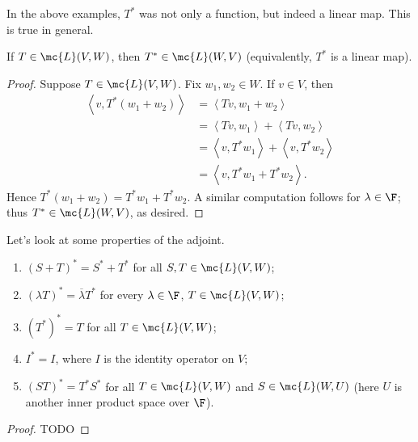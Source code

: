 \documentclass[math0540-lecture-notes.tex]{subfiles}
\begin{document}
In the above examples, $T^*$ was not only a function, but indeed a linear map. This is true in
general.
\begin{proposition}{}
  If $T\in \mc{L}(V,W)$, then $T^*\in \mc{L}(W,V)$ (equivalently, $T^*$ is a linear map).
\end{proposition}
\begin{proof}[Proof]
  Suppose $T\in \mc{L}(V,W)$. Fix $w_1,w_2\in W$. If $v\in V$, then
  \begin{align*}
    \left<v,T^*(w_1+w_2) \right>&= \left<Tv,w_1+w_2 \right>  \\
    &= \left<Tv,w_1 \right> +\left<Tv,w_2 \right>  \\
    &= \left<v,T^*w_1 \right> +\left<v,T^*w_2 \right>  \\
    &=\left<v,T^*w_1+T^*w_2 \right> 
  .\end{align*}
  Hence $T^*(w_1+w_2)=T^*w_1+T^*w_2$. A similar computation follows for $\lambda\in \F$; thus
  $T^*\in \mc{L}(W,V)$, as desired.
\end{proof}

Let's look at some properties of the adjoint.
\begin{proposition}{}
  \begin{enumerate}
    \item $(S+T)^*=S^*+T^*$ for all $S,T\in \mc{L}(V,W)$;
    \item $\left( \lambda T \right)^*=\overline{\lambda}T^* $ for every $\lambda\in \F$, $T\in
      \mc{L}(V,W)$;
    \item $(T^*)^*=T$ for all $T\in \mc{L}(V,W)$;
    \item $I^*=I$, where $I$ is the identity operator on $V$;
    \item $(ST)^*=T^*S^*$ for all $T\in \mc{L}(V,W)$ and $S\in \mc{L}(W,U)$ (here $U$ is another
      inner product space over $\F$).
  \end{enumerate}
\end{proposition}
\begin{proof}[Proof]
  TODO
\end{proof}
\end{document}
